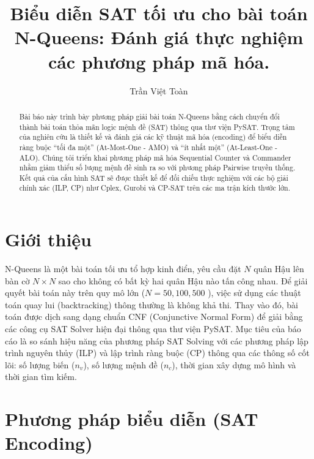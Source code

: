\documentclass[a4paper,fleqn,numbers]{cas-sc}
\begin{document}

    \title[mode=title]{
        \textbf
        {Biểu diễn SAT tối ưu cho bài toán N-Queens: Đánh giá thực nghiệm các phương pháp mã hóa.}}

    \author[1]{Trần Việt Toàn}
    \address[1]{Trường Đại học Công nghệ - ĐHQGHN}

    \begin{abstract}
        Bài báo này trình bày phương pháp giải bài toán N-Queens bằng cách chuyển đổi thành bài toán thỏa mãn logic mệnh
        đề (SAT) thông qua thư viện PySAT. Trọng tâm của nghiên cứu là thiết kế và đánh giá các kỹ thuật mã hóa
        (encoding) để biểu diễn ràng buộc ``tối đa một'' (At-Most-One - AMO) và ``ít nhất một'' (At-Least-One - ALO).
        Chúng tôi triển khai phương pháp mã hóa Sequential Counter và Commander nhằm giảm thiểu số lượng mệnh đề sinh ra
        so với phương pháp Pairwise truyền thống. Kết quả của cấu hình SAT sẽ được thiết kế để đối chiếu thực nghiệm với
        các bộ giải chính xác (ILP, CP) như Cplex, Gurobi và CP-SAT trên các ma trận kích thước lớn.
    \end{abstract}

    \maketitle


    \section{{Giới thiệu}}\label{sec:intro}
    N-Queens là một bài toán tối ưu tổ hợp kinh điển, yêu cầu đặt $N$ quân Hậu lên bàn cờ $N \times N$ sao cho không
    có bất kỳ hai quân Hậu nào tấn công nhau. Để giải quyết bài toán này trên quy mô lớn ($N = 50, 100, 500$
    ), việc sử dụng
    các thuật toán quay lui (backtracking) thông thường là không khả thi. Thay vào đó, bài toán được dịch sang dạng
    chuẩn
    CNF (Conjunctive Normal Form) để giải bằng các công cụ SAT Solver hiện đại thông qua thư viện PySAT. Mục tiêu của
    báo cáo là so sánh hiệu năng của phương pháp SAT Solving với các phương pháp lập trình nguyên thủy (ILP) và lập
    trình
    ràng buộc (CP) thông qua các thông số cốt lõi: số lượng biến ($n_v$), số lượng mệnh đề ($n_c$), thời gian xây dựng
    mô hình và thời gian tìm kiếm.


    \section{Phương pháp biểu diễn (SAT Encoding)}\label{sec:sat_encoding}
\end{document}
